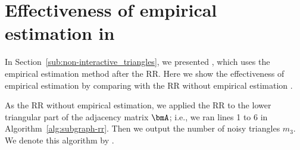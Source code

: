 \appendix




\section{Effectiveness of empirical estimation in }
\label{sec:RR_emp}
In Section~\ref{sub:non-interactive_triangles}, we presented , which uses the empirical estimation method after the RR. 
Here we show the effectiveness of empirical estimation by comparing  with the RR without empirical estimation \cite{Qin_CCS17,Ye_ICDE20}. 

As the RR without empirical estimation, we applied the RR to the lower triangular part of the adjacency matrix $\bmA$; i.e., we ran lines 1 to 6 in Algorithm~\ref{alg:subgraph-rr}. 
Then we output the number of noisy triangles $m_3$. 
We denote this algorithm by . 

